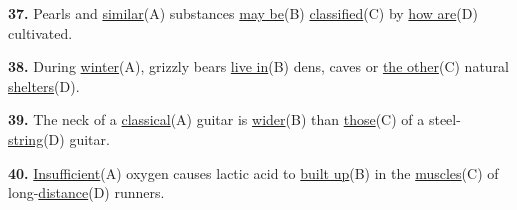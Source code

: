 \documentclass[12pt]{article}
\begin{document}
\par
\vspace{\questionblockgap}
\noindent\textbf{37.} Pearls and \uline{similar}(A) substances \uline{may be}(B) \uline{classified}(C) by \uline{how are}(D) cultivated.
\par
\vspace{\questionblockgap}
\noindent\textbf{38.} During \uline{winter}(A), grizzly bears \uline{live in}(B) dens, caves or \uline{the other}(C) natural \uline{shelters}(D).
\par
\vspace{\questionblockgap}
\noindent\textbf{39.} The neck of a \uline{classical}(A) guitar is \uline{wider}(B) than \uline{those}(C) of a steel-\uline{string}(D) guitar.
\par
\vspace{\questionblockgap}
\noindent\textbf{40.} \uline{Insufficient}(A) oxygen causes lactic acid to \uline{built up}(B) in the \uline{muscles}(C) of long-\uline{distance}(D) runners.
\par
\vspace{\questionblockgap}
\end{document}
